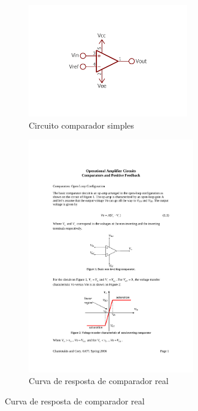 	\begin{figure}[htb]
		\caption{\label{fig_double_comparator}Comparador e curva de resposta}
		\begin{subfigure}{.5\textwidth}
			\caption{\label{fig_comparator_circuit}Circuito comparador simples}
			\centering
			\includegraphics[width=0.77\textwidth, trim={7.5cm 5cm 7.5cm 5.5cm},clip]{circuits/comparator_amp.pdf}
		\end{subfigure}
		\begin{subfigure}{.5\textwidth}
			\caption{\label{fig_comparator_transfer}Curva de resposta de comparador real}
			\centering
			\includegraphics[page=1,width=0.8\textwidth, trim={6.9cm 5.5cm 6.9cm 19.25cm},clip]{circuits/lecture_comparator.pdf}
		\end{subfigure}
	\end{figure}
	
